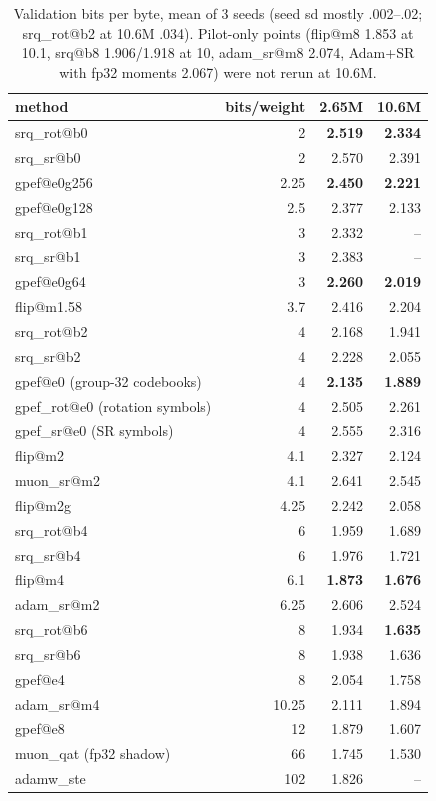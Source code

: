 \documentclass[11pt,letterpaper]{article}
\begin{document}
\begin{table}[h]\centering\small
\begin{tabular}{lrrr}
\toprule
method & bits/weight & 2.65M & 10.6M\\
\midrule
srq\_rot@b0 & 2 & \textbf{2.519} & \textbf{2.334}\\
srq\_sr@b0 & 2 & 2.570 & 2.391\\
gpef@e0g256 & 2.25 & \textbf{2.450} & \textbf{2.221}\\
gpef@e0g128 & 2.5 & 2.377 & 2.133\\
srq\_rot@b1 & 3 & 2.332 & --\\
srq\_sr@b1 & 3 & 2.383 & --\\
gpef@e0g64 & 3 & \textbf{2.260} & \textbf{2.019}\\
flip@m1.58 & 3.7 & 2.416 & 2.204\\
srq\_rot@b2 & 4 & 2.168 & 1.941\\
srq\_sr@b2 & 4 & 2.228 & 2.055\\
gpef@e0 (group-32 codebooks) & 4 & \textbf{2.135} & \textbf{1.889}\\
gpef\_rot@e0 (rotation symbols) & 4 & 2.505 & 2.261\\
gpef\_sr@e0 (SR symbols) & 4 & 2.555 & 2.316\\
flip@m2 & 4.1 & 2.327 & 2.124\\
muon\_sr@m2 & 4.1 & 2.641 & 2.545\\
flip@m2g & 4.25 & 2.242 & 2.058\\
\midrule
srq\_rot@b4 & 6 & 1.959 & 1.689\\
srq\_sr@b4 & 6 & 1.976 & 1.721\\
flip@m4 & 6.1 & \textbf{1.873} & \textbf{1.676}\\
adam\_sr@m2 & 6.25 & 2.606 & 2.524\\
srq\_rot@b6 & 8 & 1.934 & \textbf{1.635}\\
srq\_sr@b6 & 8 & 1.938 & 1.636\\
gpef@e4 & 8 & 2.054 & 1.758\\
adam\_sr@m4 & 10.25 & 2.111 & 1.894\\
gpef@e8 & 12 & 1.879 & 1.607\\
\midrule
muon\_qat (fp32 shadow) & 66 & 1.745 & 1.530\\
adamw\_ste & 102 & 1.826 & --\\
\bottomrule
\end{tabular}
\caption{Validation bits per byte, mean of 3 seeds (seed sd mostly .002--.02; srq\_rot@b2 at 10.6M .034).
Pilot-only points (flip@m8 1.853 at 10.1, srq@b8 1.906/1.918 at 10, adam\_sr@m8 2.074, Adam+SR with fp32
moments 2.067) were not rerun at 10.6M.}
\end{table}
\end{document}
